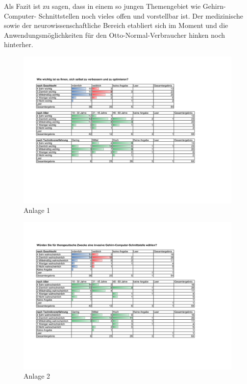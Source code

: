 \documentclass[11pt,ngerman,parskip=half]{scrartcl}
\begin{document}
Als Fazit ist zu sagen, dass in einem so jungen Themengebiet wie
Gehirn-Computer- Schnittstellen noch vieles offen und vorstellbar ist. Der
medizinische sowie der neurowissenschaftliche Bereich etabliert sich im
Moment und die Anwendungsmöglichkeiten für den Otto-Normal-Verbraucher hinken
noch hinterher.

\pagebreak
\printbibliography[heading=bibintoc]

\pagebreak
\captionsetup[figure]{list=no,labelformat=empty}
\begin{appendices}
  \begin{figure}[H]
    \centering
    \includegraphics[width=\textwidth,height=\textheight,keepaspectratio]{src/img/kathrin-a1.png}
    \caption{Anlage 1}
  \end{figure}
  \pagebreak

  \begin{figure}[H]
    \centering
    \includegraphics[width=\textwidth,height=\textheight,keepaspectratio]{src/img/kathrin-a2.png}
    \caption{Anlage 2}
  \end{figure}
  \pagebreak


\end{appendices}
\end{document}
